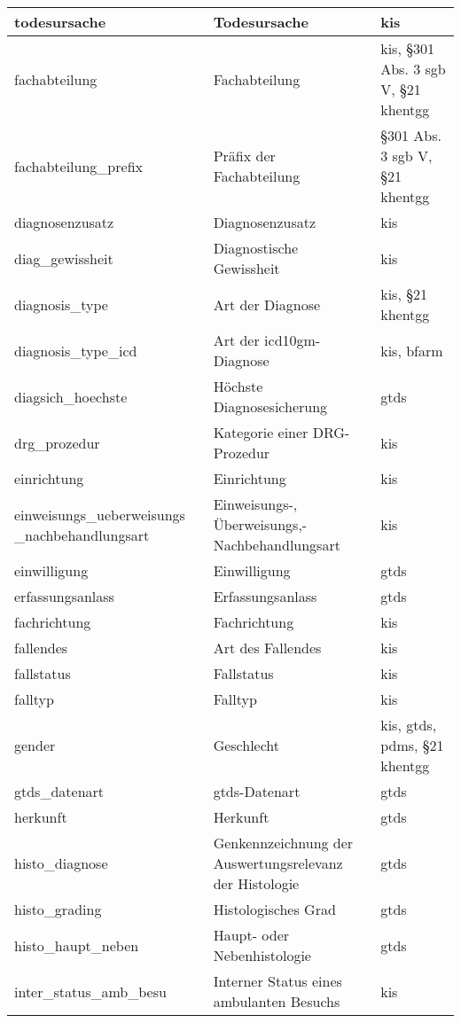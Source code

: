 \begin{longtable}{||p{5cm}|p{7cm}|p{4cm}||}
  	todesursache & Todesursache & \ac{kis} \\ \hline
  	fachabteilung & Fachabteilung & \ac{kis}, \S 301 Abs. 3 \acs{sgb} V, \S 21 \ac{khentgg} \\ \hline
  	fachabteilung\_prefix & Präfix der Fachabteilung  & \S 301 Abs. 3 \acs{sgb} V, \S 21 \ac{khentgg}  \\ \hline
  	diagnosenzusatz & Diagnosenzusatz & \ac{kis} \\ \hline
  	diag\_gewissheit & Diagnostische Gewissheit & \ac{kis} \\ \hline
  	diagnosis\_type & Art der Diagnose & \ac{kis}, \S 21 \ac{khentgg} \\ \hline
  	diagnosis\_type\_icd & Art der \acs{icd10gm}-Diagnose & \ac{kis}, \acs{bfarm} \\ \hline
  	diagsich\_hoechste & Höchste Diagnosesicherung & \ac{gtds} \\ \hline
  	drg\_prozedur & Kategorie einer DRG-Prozedur & \ac{kis} \\ \hline
  	einrichtung & Einrichtung & \ac{kis} \\ \hline
  	einweisungs\_ueberweisungs \_nachbehandlungsart & Einweisungs-, Überweisungs,- Nachbehandlungsart & \ac{kis}\\ \hline
  	einwilligung & Einwilligung & \ac{gtds}\\ \hline
  	erfassungsanlass & Erfassungsanlass & \ac{gtds} \\ \hline
  	fachrichtung & Fachrichtung & \ac{kis} \\ \hline
  	fallendes & Art des Fallendes & \ac{kis} \\ \hline
  	fallstatus & Fallstatus & \ac{kis} \\ \hline
  	falltyp & Falltyp & \ac{kis} \\ \hline
  	gender & Geschlecht & \ac{kis}, \ac{gtds}, \ac{pdms}, \S 21 \ac{khentgg} \\ \hline
  	gtds\_datenart & \ac{gtds}-Datenart & \ac{gtds} \\ \hline
  	herkunft & Herkunft & \ac{gtds} \\ \hline
  	histo\_diagnose & Genkennzeichnung der Auswertungsrelevanz der Histologie & \ac{gtds} \\ \hline
  	histo\_grading & Histologisches Grad & \ac{gtds} \\ \hline
  	histo\_haupt\_neben & Haupt- oder Nebenhistologie & \ac{gtds} \\ \hline
  	inter\_status\_amb\_besu & Interner Status eines ambulanten Besuchs & \ac{kis} \\ \hline

\end{longtable}
